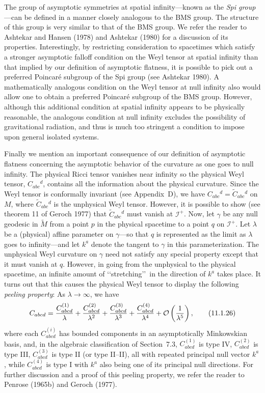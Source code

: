 The group of asymptotic symmetries at spatial infinity---known as the \emph{Spi
group}---can be defined in a manner closely analogous to the BMS group. The
structure of this group is very similar to that of the BMS group. We refer the reader
to Ashtekar and Hansen (1978) and Ashtekar (1980) for a discussion of its properties.
Interestingly, by restricting consideration to spacetimes which satisfy a stronger
asymptotic falloff condition on the Weyl tensor at spatial infinity than that implied by
our definition of asymptotic flatness, it is possible to pick out a preferred Poincar\'e
subgroup of the Spi group (see Ashtekar 1980). A mathematically analogous condition
on the Weyl tensor at null infinity also would allow one to obtain a preferred
Poincar\'e subgroup of the BMS group. However, although this additional condition at
spatial infinity appears to be physically reasonable, the analogous condition at null
infinity excludes the possibility of gravitational radiation, and thus is much too
stringent a condition to impose upon general isolated systems.

Finally we mention an important consequence of our definition of asymptotic flatness
concerning the asymptotic behavior of the curvature as one goes to null infinity. The
physical Ricci tensor vanishes near infinity so the physical Weyl tensor,
\(C_{abc}{}^d\), contains all the information about the physical curvature. Since the
Weyl tensor is conformally invariant (see Appendix~D), we have
\(C_{abc}{}^d=\tilde C_{abc}{}^d\) on \(M\), where \(\tilde C_{abc}{}^d\) is the
unphysical Weyl tensor. However, it is possible to show (see theorem 11 of Geroch
1977) that \(\tilde C_{abc}{}^d\) must vanish at \(\mathcal I^+\). Now, let
\(\gamma\) be any null geodesic in \(\tilde M\) from a point \(p\) in the physical
spacetime to a point \(q\) on \(\mathcal I^+\). Let \(\lambda\) be a (physical) affine
parameter on \(\gamma\)---so that \(q\) is represented as the limit as \(\lambda\)
goes to infinity---and let \(k^a\) denote the tangent to \(\gamma\) in this
parameterization. The unphysical Weyl curvature on \(\gamma\) need not satisfy any
special property except that it must vanish at \(q\). However, in going from the
unphysical to the physical spacetime, an infinite amount of \lq\lq stretching\rq\rq\ in
the direction of \(k^a\) takes place. It turns out that this causes the physical Weyl
tensor to display the following \emph{peeling property}: As \(\lambda\to\infty\), we
have
\begin{equation}
  C_{abcd}=
  \frac{C^{(1)}_{abcd}}{\lambda}
  +\frac{C^{(2)}_{abcd}}{\lambda^2}
  +\frac{C^{(3)}_{abcd}}{\lambda^3}
  +\frac{C^{(4)}_{abcd}}{\lambda^4}
  +\mathcal{O}\left(\frac{1}{\lambda^5}\right),
  \tag{11.1.26}\label{eq:11.1.26}
\end{equation}
where each \(C^{(i)}_{abcd}\) has bounded components in an asymptotically
Minkowskian basis, and, in the algebraic classification of Section~7.3,
\(C^{(1)}_{abcd}\) is type IV, \(C^{(2)}_{abcd}\) is type III,
\(C^{(3)}_{abcd}\) is type II (or type II--II), all with repeated principal null
vector \(k^a\), while \(C^{(4)}_{abcd}\) is type I with \(k^a\) also being one of
its principal null directions. For further discussion and a proof of this peeling
property, we refer the reader to Penrose (1965b) and Geroch (1977).
